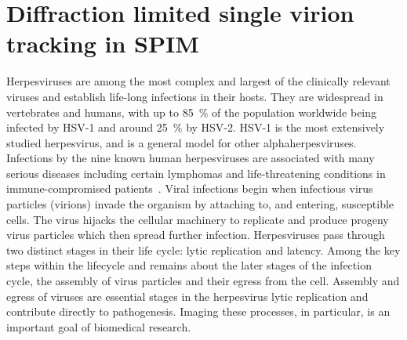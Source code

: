 \ifpdf
    \graphicspath{{Chapters/spt/Figs/Raster/}{Chapters/spt/Figs/PDF/}{Chapters/spt/Figs/}}
\else
    \graphicspath{{Chapters/spt/Figs/Vector/}{Chapters/spt/Figs/}}
\fi

\chapter{Diffraction limited single virion tracking in SPIM}\label{chapter:spt}


Herpesviruses are among the most complex and largest of the clinically relevant viruses and establish life-long infections in their hosts.
They are widespread in vertebrates and humans, with up to \SI{85}{\percent} of the population worldwide being infected by \gls{HSV}-1 and around \SI{25}{\percent} by \gls{HSV}-2.
\gls{HSV}-1 is the most extensively studied herpesvirus, and is a general model for other alphaherpesviruses.
Infections by the nine known human herpesviruses are associated with many serious diseases including certain lymphomas and life-threatening conditions in immune-compromised patients~\cite{meyding-lamadeHerpesvirusInfectionsCentral2012}.
Viral infections begin when infectious virus particles (\gls{virion}s) invade the organism by attaching to, and entering, susceptible cells.
The virus hijacks the cellular machinery to replicate and produce progeny virus particles which then spread further infection.
Herpesviruses pass through two distinct stages in their life cycle: lytic replication and latency.
Among the key steps within the lifecycle and remains about the later
stages of the infection cycle, the assembly of virus particles and their egress from the cell.
Assembly and egress of viruses are essential stages in the herpesvirus lytic replication and contribute directly to pathogenesis.
Imaging these processes, in particular, is an important goal of biomedical research.

